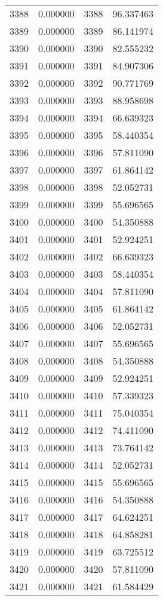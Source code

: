 \documentclass[12pt]{article}
\begin{document}
\begin{longtable}{@{}cccc@{}}
3388 & 0.000000 & 3388 & 96.337463 \\
3389 & 0.000000 & 3389 & 86.141974 \\
3390 & 0.000000 & 3390 & 82.555232 \\
3391 & 0.000000 & 3391 & 84.907306 \\
3392 & 0.000000 & 3392 & 90.771769 \\
3393 & 0.000000 & 3393 & 88.958698 \\
3394 & 0.000000 & 3394 & 66.639323 \\
3395 & 0.000000 & 3395 & 58.440354 \\
3396 & 0.000000 & 3396 & 57.811090 \\
3397 & 0.000000 & 3397 & 61.864142 \\
3398 & 0.000000 & 3398 & 52.052731 \\
3399 & 0.000000 & 3399 & 55.696565 \\
3400 & 0.000000 & 3400 & 54.350888 \\
3401 & 0.000000 & 3401 & 52.924251 \\
3402 & 0.000000 & 3402 & 66.639323 \\
3403 & 0.000000 & 3403 & 58.440354 \\
3404 & 0.000000 & 3404 & 57.811090 \\
3405 & 0.000000 & 3405 & 61.864142 \\
3406 & 0.000000 & 3406 & 52.052731 \\
3407 & 0.000000 & 3407 & 55.696565 \\
3408 & 0.000000 & 3408 & 54.350888 \\
3409 & 0.000000 & 3409 & 52.924251 \\
3410 & 0.000000 & 3410 & 57.339323 \\
3411 & 0.000000 & 3411 & 75.040354 \\
3412 & 0.000000 & 3412 & 74.411090 \\
3413 & 0.000000 & 3413 & 73.764142 \\
3414 & 0.000000 & 3414 & 52.052731 \\
3415 & 0.000000 & 3415 & 55.696565 \\
3416 & 0.000000 & 3416 & 54.350888 \\
3417 & 0.000000 & 3417 & 64.624251 \\
3418 & 0.000000 & 3418 & 64.858281 \\
3419 & 0.000000 & 3419 & 63.725512 \\
3420 & 0.000000 & 3420 & 57.811090 \\
3421 & 0.000000 & 3421 & 61.584429 \\

\end{longtable}
\end{document}
